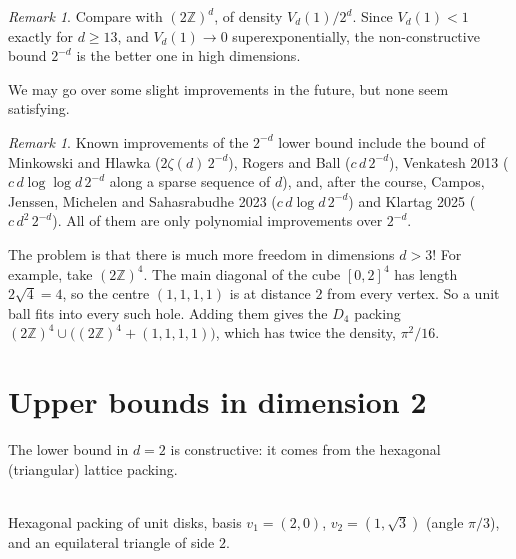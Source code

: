 \documentclass[11pt,openany]{book}
\theoremstyle{plain}
\theoremstyle{definition}
\theoremstyle{remark}
\newtheorem{remark}[theorem]{Remark}
\newcommand{\added}[1]{{\color{addcol}#1}}
\newcommand{\unclear}[1]{\marginpar{\raggedright\scriptsize\color{flagcol}\textbf{?} #1}}
\newcommand{\orig}[1]{\marginpar{\raggedright\scriptsize\color{gray}#1}}
\newcommand{\Z}{\mathbb{Z}}
\begin{document}
\begin{remark}
\added{Compare with $(2\Z)^d$, of density $V_d(1)/2^d$. Since $V_d(1)<1$ exactly for
$d\ge13$, and $V_d(1)\to0$ superexponentially, the non-constructive bound $2^{-d}$ is
the better one in high dimensions.}
\end{remark}

We may go over some slight improvements in the future, but none seem satisfying.
\begin{remark}
\added{Known improvements of the $2^{-d}$ lower bound include the bound of
Minkowski and Hlawka
($2\zeta(d)\,2^{-d}$), Rogers and Ball ($c\,d\,2^{-d}$), Venkatesh 2013
($c\,d\log\log d\,2^{-d}$ along a sparse sequence of $d$), and, after the course,
Campos, Jenssen, Michelen and Sahasrabudhe 2023 ($c\,d\log d\,2^{-d}$) and
Klartag 2025 ($c\,d^2\,2^{-d}$). All of them are only polynomial improvements over $2^{-d}$.}
\end{remark}

The problem is that there is much more freedom in dimensions $d>3$!
\unclear{``$d>3$! even.'': perhaps ``even $d=4$''}
For example, take $(2\Z)^4$. The main diagonal of the cube $[0,2]^4$ has length
$2\sqrt4=4$, so the centre $(1,1,1,1)$ is at distance $2$ from every vertex.
\added{So a unit ball fits into every such hole. Adding them gives the
$D_4$ packing $(2\Z)^4\cup\bigl((2\Z)^4+(1,1,1,1)\bigr)$, which has twice the density,
$\pi^2/16$.}

\section{Upper bounds in dimension 2}
\label{L1:sec:upper2}
\orig{\S1.4}

The lower bound in $d=2$ is constructive: it comes from the hexagonal (triangular) lattice packing.

\begin{center}
\\[2pt]
{\small Hexagonal packing of unit disks, basis $v_1=(2,0)$, $v_2=(1,\sqrt3)$ \added{(angle $\pi/3$)}, and an equilateral triangle of side $2$.}
\end{center}
\end{document}
